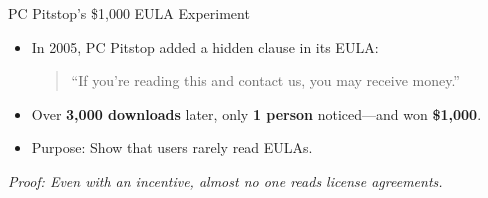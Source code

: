 \begin{frame}{PC Pitstop's \$1,000 EULA Experiment}
\begin{itemize}
    \item In 2005, PC Pitstop added a hidden clause in its EULA:
    \begin{quote}
        “If you’re reading this and contact us, you may receive money.”
    \end{quote}
    \item Over \textbf{3,000 downloads} later, only \textbf{1 person} noticed—and won \textbf{\$1,000}.
    \item Purpose: Show that users rarely read EULAs.
\end{itemize}

\vspace{0.3cm}
\textit{Proof: Even with an incentive, almost no one reads license agreements.\cite{MONEY}}
\end{frame}

